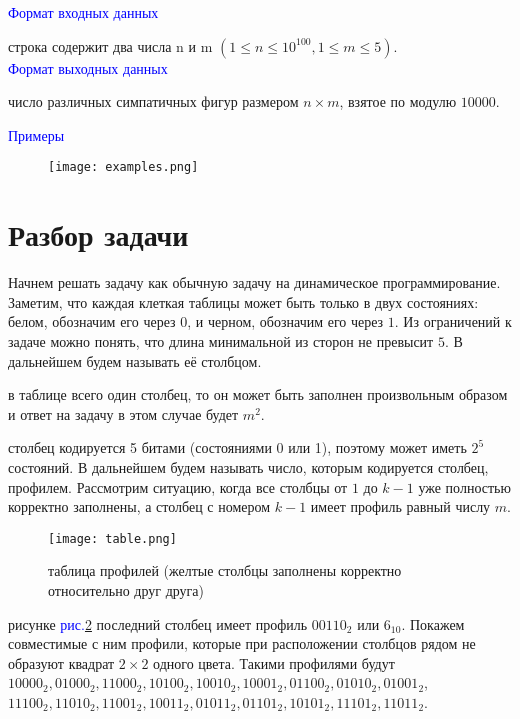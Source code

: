 \documentclass{article}
\begin{document}
\textcolor{blue}{Формат входных данных}

 строка содержит два числа n и m $(1 \le n \le 10^{100},1 \le m \le 5)$.
\\

\textcolor{blue}{Формат выходных данных}

 число различных симпатичных фигур размером $n \times m$, взятое по модулю $10000$.
\\

\par\textcolor{blue}{Примеры}

\begin{figure}[htp]
    \centering
    \texttt{[image: examples.png]}
    \label{fig:examples}
\end{figure}

\newpage
\setcounter{page}{2}
\section*{Разбор задачи}

\par Начнем решать задачу как обычную задачу на динамическое программирование. Заметим, что каждая клеткая таблицы может быть только в двух состояниях: белом, обозначим его через $0$, и черном, обозначим его через $1$. Из ограничений к задаче можно понять, что длина минимальной из сторон не превысит $5$. В дальнейшем будем называть её столбцом.

 в таблице всего один столбец, то он может быть заполнен произвольным образом и ответ на задачу в этом случае будет $m^2$.

 столбец кодируется 5 битами (состояниями 0 или 1), поэтому может иметь $2^5$ состояний. В дальнейшем будем называть число, которым кодируется столбец, профилем. Рассмотрим ситуацию, когда все столбцы от $1$ до $k - 1$ уже полностью корректно заполнены, а столбец с номером $k - 1$ имеет профиль равный числу $m$.

\begin{figure}[htp]
    \centering
    \texttt{[image: table.png]}
    \caption{\label{fig:table} таблица профилей (желтые столбцы заполнены корректно относительно друг друга)}
    \label{fig:table}
\end{figure}

 рисунке \textcolor{blue}{рис.}\ref{fig:table} последний столбец имеет профиль $00110_2$ или $6_{10}$. Покажем совместимые с ним профили, которые при расположении столбцов рядом не образуют квадрат $2 \times 2$ одного цвета. Такими профилями будут $10000_2, 01000_2, 11000_2, 10100_2, 10010_2, 10001_2, 01100_2, 01010_2, 01001_2$, $11100_2, 11010_2, 11001_2, 10011_2, 01011_2, 01101_2, 10101_2, 11101_2, 11011_2$.
\end{document}
